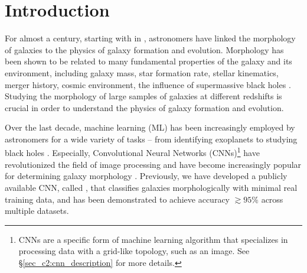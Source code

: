 \section{Introduction} \label{sec_c2:intro}
For almost a century, starting with \citeauthor{hubble_1926} in \citeyear{hubble_1926}, astronomers have linked the morphology of galaxies to the physics of  galaxy formation and evolution. Morphology has been shown to be related to many fundamental properties of the galaxy and its environment, including galaxy mass, star formation rate, stellar kinematics, merger history, cosmic environment, the influence of supermassive black holes \citep[e.g.,][]{Bender1992DynamicallyProperties,Tremaine2002TheCorrelation,pozzetti_10, wuyts_11, Schawinski2014TheGalaxies, Huertas-Company2016MassCANDELS,powell_17, Shimakawa2021Subaru0.30.6, Dimauro2022CoincidenceGrowth}. Studying the morphology of large samples of galaxies at different redshifts is crucial in order to understand the physics of galaxy formation and evolution. 

Over the last decade, machine learning (ML) has been increasingly employed by astronomers for a wide variety of tasks -- from identifying exoplanets to studying black holes \citep[e.g.,][]{ml_pz,ml_sz,Shallue2018IdentifyingKepler-90,Sharma2020ApplicationClassification,Natarajan2021QuasarNet:Holes}. Especially, Convolutional Neural Networks (CNNs)\footnote{CNNs are a specific form of machine learning algorithm that specializes in processing data with a grid-like topology, such as an image. See \S \ref{sec_c2:cnn_description} for more details.} have revolutionized the field of image processing and have become increasingly popular for determining galaxy morphology \citep[e.g.,][]{Dieleman2015Rotation-invariantPrediction, Huertas-Company2015ALEARNING, Tuccillo2018DeepFitting, Hausen2020MorpheusData, Walmsley2020GalaxyLearning, Cheng2021GalaxyNetworks, Vega-Ferrero2021PushingSurvey, Tarsitano2022ImageLearning}. Previously, we have developed a publicly available CNN, called \gamornet{} \citep{Ghosh2020GalaxyGalaxies}, that classifies galaxies morphologically with minimal real training data, and has been demonstrated to achieve accuracy $\gtrsim 95\%$ across multiple datasets. 

